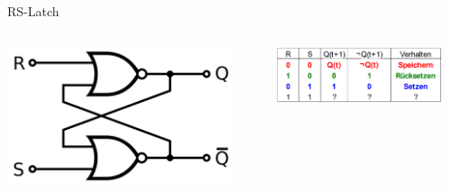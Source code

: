 \documentclass[
  german,            %
  aspectratio=169,    %
]{tumbeamer}
\begin{document}
\begin{frame}[c]{RS-Latch}{}
	\begin{columns}[c]
		\begin{column}{0.5\textwidth}
			\centering
			\includegraphics[width=0.9\textwidth]{w07_RS_Flip-flop_(NOR).svg.png}
		\end{column}
		\begin{column}{0.5\textwidth}
			\centering
			\includegraphics[width=0.9\textwidth]{w07_rs_table_lv.png}
		\end{column}
	\end{columns}
\end{frame}
\end{document}
